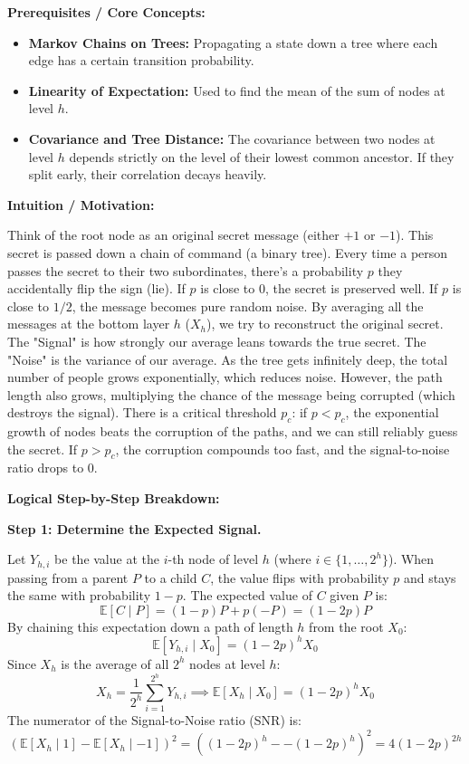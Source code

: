 \begin{solution}
\textbf{Prerequisites / Core Concepts:}
\begin{itemize}
    \item \textbf{Markov Chains on Trees:} Propagating a state down a tree where each edge has a certain transition probability.
    \item \textbf{Linearity of Expectation:} Used to find the mean of the sum of nodes at level $h$.
    \item \textbf{Covariance and Tree Distance:} The covariance between two nodes at level $h$ depends strictly on the level of their lowest common ancestor. If they split early, their correlation decays heavily.
\end{itemize}

\textbf{Intuition / Motivation:}

Think of the root node as an original secret message (either $+1$ or $-1$). This secret is passed down a chain of command (a binary tree). Every time a person passes the secret to their two subordinates, there's a probability $p$ they accidentally flip the sign (lie). 
If $p$ is close to 0, the secret is preserved well. If $p$ is close to $1/2$, the message becomes pure random noise.
By averaging all the messages at the bottom layer $h$ ($X_h$), we try to reconstruct the original secret. The "Signal" is how strongly our average leans towards the true secret. The "Noise" is the variance of our average.
As the tree gets infinitely deep, the total number of people grows exponentially, which reduces noise. However, the path length also grows, multiplying the chance of the message being corrupted (which destroys the signal). There is a critical threshold $p_c$: if $p < p_c$, the exponential growth of nodes beats the corruption of the paths, and we can still reliably guess the secret. If $p > p_c$, the corruption compounds too fast, and the signal-to-noise ratio drops to 0.

\textbf{Logical Step-by-Step Breakdown:}

\textbf{Step 1: Determine the Expected Signal.}

Let $Y_{h,i}$ be the value at the $i$-th node of level $h$ (where $i \in \{1, \dots, 2^h\}$).
When passing from a parent $P$ to a child $C$, the value flips with probability $p$ and stays the same with probability $1-p$.
The expected value of $C$ given $P$ is:
\[ \mathbb{E}[C \mid P] = (1-p)P + p(-P) = (1-2p)P \]
By chaining this expectation down a path of length $h$ from the root $X_0$:
\[ \mathbb{E}[Y_{h,i} \mid X_0] = (1-2p)^h X_0 \]
Since $X_h$ is the average of all $2^h$ nodes at level $h$:
\[ X_h = \frac{1}{2^h} \sum_{i=1}^{2^h} Y_{h,i} \implies \mathbb{E}[X_h \mid X_0] = (1-2p)^h X_0 \]
The numerator of the Signal-to-Noise ratio (SNR) is:
\[ (\mathbb{E}[X_h \mid 1] - \mathbb{E}[X_h \mid -1])^2 = ((1-2p)^h - -(1-2p)^h)^2 = 4(1-2p)^{2h} \]


\end{solution}
